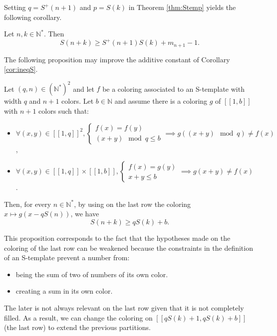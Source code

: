 \documentclass[final,onefignum,onetabnum]{siamart190516}
\begin{document}
Setting \(q = S^+(n+1)\) and \(p = S(k)\) in Theorem \ref{thm:Stemp} yields the following corollary.

\begin{corollary}
\label{cor:ineqS}
	Let \(n, k \in \mathbb{N}^*\). Then
	\[ S(n+k) \geqslant S^+(n+1)S(k) + m_{n+1} - 1.\]
\end{corollary}

The following proposition may improve the additive constant of Corollary \ref{cor:ineqS}.

\begin{proposition}
\label{prop:rafStemp}
Let \((q, n) \in \left(\mathbb{N}^* \right)^2\) and let \(f\) be a coloring associated to an S-template with width \(q\) and \(n+1\) 
colors. Let \(b \in \mathbb{N}\) and assume there is a coloring \(g\) of 
\([\![1, b]\!]\) with \(n+1\) colors such that:
	
\begin{itemize}
\item \(\forall (x, y) \in [\![1, q]\!]^2, \left\{
	\begin{array}{l}
		f(x) = f(y) \\
		(x + y) \mod q \leqslant b
	\end{array}
	\right. \implies g((x + y) \mod q) \neq f(x)\),
\item \(\forall (x, y) \in [\![1, q]\!] \times  [\![1, b]\!],  \left\{
	\begin{array}{l}
		f(x) = g(y) \\
		x + y \leqslant b
	\end{array}
	\right. \implies g(x + y) \neq f(x)\).
\end{itemize}
	
Then, for every \(n \in \mathbb{N}^*\), by using on the last row the coloring \(x \longmapsto g(x - q S(n))\), we have
\[ S(n+k) \geqslant q S(k) + b.\]
\end{proposition}
This proposition corresponds to the fact that the hypotheses made on the coloring of the last row can be weakened because 
the constraints in the definition of an S-template prevent a number from: 
\begin{itemize}
\item being the sum of two of numbers of its own color. 
\item creating a sum in its own color. 
\end{itemize}
The later is not always relevant on the last row given that it is not completely filled.
As a result, we can change the coloring on \([\![ q S(k) + 1,  q S(k) + b]\!]\) (the last row) to extend the previous partitions.
\newline
\end{document}

